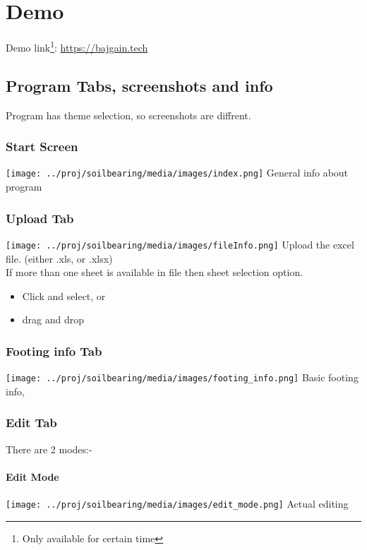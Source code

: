 \chapter{Demo}
Demo link\footnote{Only available for certain time}: \url{https://bajgain.tech}\\

\section{Program Tabs, screenshots and info}
Program has theme selection, so screenshots are diffrent.\\
\subsection{Start Screen}
\texttt{[image: ../proj/soilbearing/media/images/index.png]}
General info about program\\

\subsection{Upload Tab}
\texttt{[image: ../proj/soilbearing/media/images/fileInfo.png]}
Upload the excel file. (either .xls, or .xlsx)\\
If more than one sheet is available in file then sheet selection option.\\
\begin{itemize}
\item Click and select, or\\
\item drag and drop\\
\end{itemize}

\subsection{Footing info Tab}
\texttt{[image: ../proj/soilbearing/media/images/footing\_info.png]}
Basic footing info,\\

\subsection{Edit Tab}
There are 2 modes:-\\
\subsubsection{Edit Mode}
\texttt{[image: ../proj/soilbearing/media/images/edit\_mode.png]}
Actual editing\\

